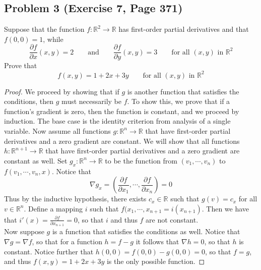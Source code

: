 \documentclass{article}
\begin{document}
\subsection*{Problem 3 (Exercise 7, Page 371)}
Suppose that the function $f \colon \mathbb{R}^2 \to \mathbb{R}$ has first-order partial derivatives and that $f(0, 0) = 1$, while
\[ \frac{\partial f}{\partial x}(x, y) = 2 \qquad \text{and} \qquad \frac{\partial f}{\partial y}(x, y) = 3 \qquad \text{for all $(x, y)$ in $\mathbb{R}^2$}\]
Prove that
\[ f(x, y) = 1 + 2x + 3y \qquad \text{for all $(x, y)$ in $\mathbb{R}^2$}\]
\begin{proof}
We proceed by showing that if $g$ is another function that satisfies the conditions, then $g$ must necessarily be $f$. To show this, we prove that if a function's gradient is zero, then the function is constant, and we proceed by induction. The base case is the identity criterion from analysis of a single variable. Now assume all functions $g \colon \mathbb{R}^n \to \mathbb{R}$ that have first-order partial derivatives and a zero gradient are constant. We will show that all functions $h \colon \mathbb{R}^{n+1} \to \mathbb{R}$ that have first-order partial derivatives and a zero gradient are constant as well. Set $g_x \colon \mathbb{R}^n \to \mathbb{R}$ to be the function from $(v_1, \cdots, v_n)$ to $f(v_1, \cdots, v_n, x)$. Notice that 
\[ \nabla g_x = \left(\frac{\partial f}{\partial x_1}, \cdots, \frac{\partial f}{\partial x_n}\right) = 0\]
Thus by the inductive hypothesis, there exists $c_x \in \mathbb{R}$ such that $g(v) = c_x$ for all $v \in \mathbb{R}^n$. Define a mapping $i$ such that $f(x_1, \cdots, x_{n+1} = i(x_{n+1})$. Then we have that $i'(x) = \frac{\partial f}{\partial x_{n+1}} = 0$, so that $i$ and thus $f$ are not constant. \\
Now suppose $g$ is a function that satisfies the conditions as well. Notice that $\nabla g = \nabla f$, so that for a function $h = f - g$ it follows that $\nabla h = 0$, so that $h$ is constant. Notice further that $h(0, 0) = f(0, 0) - g(0, 0) = 0$, so that $f = g$, and thus $f(x, y) = 1 + 2x + 3y$ is the only possible function.
\end{proof}
\end{document}
